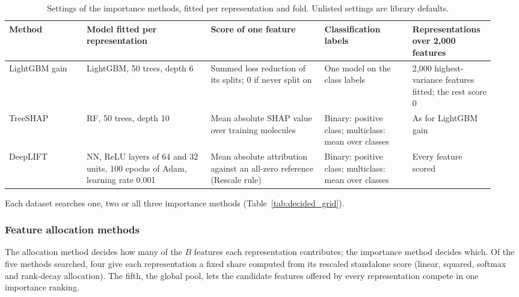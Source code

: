\begin{table}[htbp]
\centering
\small
\begin{adjustbox}{max width=\textwidth,max totalheight=0.78\textheight}
\begin{tabular}{@{}P{0.15\linewidth}P{0.24\linewidth}P{0.22\linewidth}P{0.17\linewidth}P{0.16\linewidth}@{}}
\toprule
Method & Model fitted per representation & Score of one feature & Classification labels & Representations over 2{,}000 features \\
\midrule
LightGBM gain & LightGBM, 50 trees, depth 6 & Summed loss reduction of its splits; 0 if never split on & One model on the class labels & 2{,}000 highest-variance features fitted; the rest score 0 \\
TreeSHAP & RF, 50 trees, depth 10 & Mean absolute SHAP value over training molecules & Binary: positive class; multiclass: mean over classes & As for LightGBM gain \\
DeepLIFT & NN, ReLU layers of 64 and 32 units, 100 epochs of Adam, learning rate 0.001 & Mean absolute attribution against an all-zero reference (Rescale rule) & Binary: positive class; multiclass: mean over classes & Every feature scored \\
\bottomrule
\end{tabular}
\end{adjustbox}
\caption[Settings of the importance methods.]{Settings of the importance methods, fitted per representation and fold. Unlisted settings are library defaults.}
\label{tab:importance_methods}
\end{table}


Each dataset searches one, two or all three importance methods (Table~\ref{tab:decided_grid}).



\subsubsection{Feature allocation methods}\label{sec:method:allocation}


The allocation method decides how many of the $B$ features each representation contributes; the importance method decides which. Of the five methods searched, four give each representation a fixed share computed from its rescaled standalone score (linear, squared, softmax and rank-decay allocation). The fifth, the global pool, lets the candidate features offered by every representation compete in one importance ranking.

